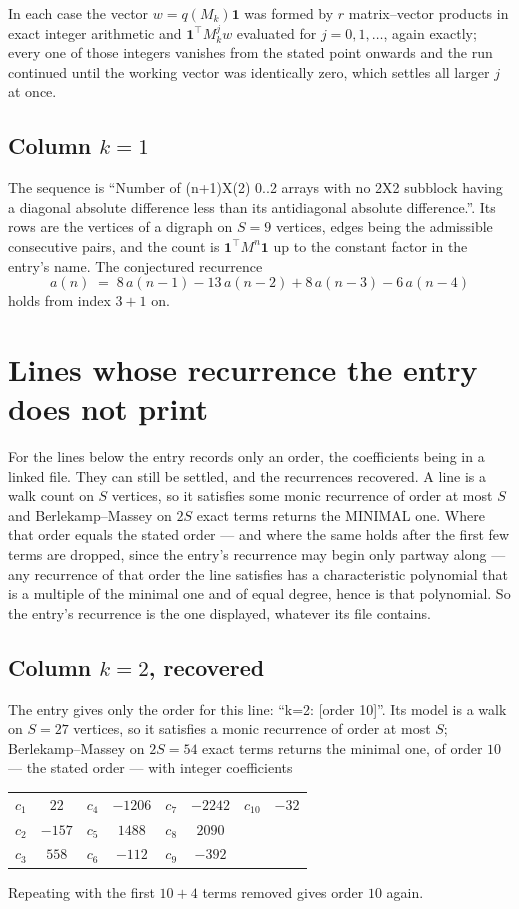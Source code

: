 \documentclass[11pt,a4paper]{article}
\theoremstyle{plain}
\theoremstyle{definition}
\begin{document}
In each case the vector $w=q(M_k)\mathbf{1}$ was formed by $r$ matrix--vector products in
exact integer arithmetic and $\mathbf{1}^{\!\top}M_k^{j}w$ evaluated for $j=0,1,\dots$,
again exactly; every one of those integers vanishes from the stated point onwards and the run
continued until the working vector was identically zero, which settles all larger $j$ at once.

\subsection*{Column $k$$=1$}
The sequence is ``Number of (n+1)X(2) 0..2 arrays with no 2X2 subblock having a diagonal absolute difference less than its antidiagonal absolute difference.''. Its rows are the vertices of a digraph on
$S=9$ vertices, edges being the admissible consecutive pairs, and the count is
$\mathbf{1}^{\!\top}M^{n}\mathbf{1}$ up to the constant factor in the entry's name.
The conjectured recurrence
\[
a(n)\;=\;8\,a(n-1) - 13\,a(n-2) + 8\,a(n-3) - 6\,a(n-4)
\]
holds from index $3+1$ on.


\section{Lines whose recurrence the entry does not print}

For the lines below the entry records only an order, the coefficients being in a linked file.
They can still be settled, and the recurrences recovered. A line is a walk count on $S$
vertices, so it satisfies some monic recurrence of order at most $S$ and Berlekamp--Massey on
$2S$ exact terms returns the MINIMAL one. Where that order equals the stated order --- and
where the same holds after the first few terms are dropped, since the entry's recurrence may
begin only partway along --- any recurrence of that order the line satisfies has a
characteristic polynomial that is a multiple of the minimal one and of equal degree, hence is
that polynomial. So the entry's recurrence is the one displayed, whatever its file contains.

\subsection*{Column $k=2$, recovered}
The entry gives only the order for this line: ``k=2: [order 10]''. Its model is a walk on
$S=27$ vertices, so it satisfies a monic recurrence of order at most $S$;
Berlekamp--Massey on $2S=54$ exact terms returns the minimal one, of order
$10$ --- the stated order --- with integer coefficients
\begin{center}\small\begin{tabular}{cccccccc}
$c_{1}$ & $22$ & $c_{4}$ & $-1206$ & $c_{7}$ & $-2242$ & $c_{10}$ & $-32$ \\
$c_{2}$ & $-157$ & $c_{5}$ & $1488$ & $c_{8}$ & $2090$ &  &  \\
$c_{3}$ & $558$ & $c_{6}$ & $-112$ & $c_{9}$ & $-392$ &  &  \\
\end{tabular}\end{center}
Repeating with the first $10+4$ terms removed gives order $10$ again.
\end{document}
